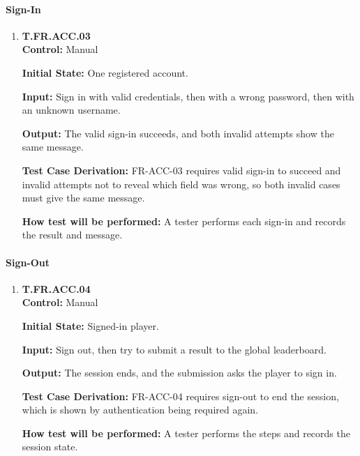 \documentclass[12pt, titlepage]{article}
\begin{document}
{\begin{enumerate}
\end{enumerate}

\paragraph{Sign-In}

\begin{enumerate}

\item{\hypertarget{test-fr-acc-03}{}\textbf{T.FR.ACC.03}\\}
\textbf{Control:} Manual

\textbf{Initial State:} One registered account.

\textbf{Input:} Sign in with valid credentials, then with a wrong password, then with an
unknown username.

\textbf{Output:} The valid sign-in succeeds, and both invalid attempts show the same
message.

\textbf{Test Case Derivation:} \mbox{FR-ACC-03} requires valid sign-in to succeed and
invalid attempts not to reveal which field was wrong, so both invalid cases must give
the same message.

\textbf{How test will be performed:} A tester performs each sign-in and records the
result and message.

\end{enumerate}

\paragraph{Sign-Out}

\begin{enumerate}

\item{\hypertarget{test-fr-acc-04}{}\textbf{T.FR.ACC.04}\\}
\textbf{Control:} Manual

\textbf{Initial State:} Signed-in player.

\textbf{Input:} Sign out, then try to submit a result to the global leaderboard.

\textbf{Output:} The session ends, and the submission asks the player to sign in.

\textbf{Test Case Derivation:} \mbox{FR-ACC-04} requires sign-out to end the session,
which is shown by authentication being required again.

\textbf{How test will be performed:} A tester performs the steps and records the session
state.


\end{enumerate}}
\end{document}
